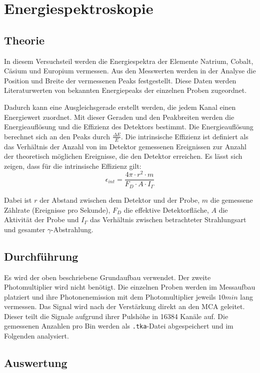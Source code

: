 \documentclass{../Misc/MontavonLaTeX/Montavon}
\begin{document}
\section{Energiespektroskopie}
\subsection{Theorie}
In diesem Versuchsteil werden die Energiespektra der Elemente Natrium, Cobalt, Cäsium und Europium vermessen. Aus den Messwerten werden in der Analyse die Position und Breite der vermessenen Peaks festgestellt.
Diese Daten werden Literaturwerten von bekannten Energiepeaks der einzelnen Proben zugeordnet. 

Dadurch kann eine Ausgleichsgerade erstellt werden, die jedem Kanal einen Energiewert zuordnet. Mit dieser Geraden und den Peakbreiten werden die Energieauflösung und die Effizienz des Detektors bestimmt. Die Energieauflösung berechnet sich an den Peaks durch $\frac{\Delta E}{E}$. Die intrinsische Effizienz ist definiert als das Verhältnis der Anzahl von im Detektor gemessenen Ereignissen zur Anzahl der theoretisch möglichen Ereignisse, die den Detektor erreichen. Es lässt sich zeigen, dass für die intrinsische Effizienz gilt:
\begin{equation}
\epsilon_{int} = \frac{4\pi \cdot r^{2} \cdot m}{F_{D} \cdot A \cdot I_{\Gamma}}
\label{eq:Effizienz}
\end{equation}

Dabei ist $r$ der Abstand zwischen dem Detektor und der Probe, $m$ die gemessene Zählrate (Ereignisse pro Sekunde), $F_D$ die effektive Detektorfläche, $A$ die Aktivität der Probe und $I_\Gamma$ das Verhältnis zwischen betrachteter Strahlungsart und gesamter $\gamma$-Abstrahlung.

\subsection{Durchführung}
Es wird der oben beschriebene Grundaufbau verwendet. Der zweite Photomultiplier wird nicht benötigt. Die einzelnen Proben werden im Messaufbau platziert und ihre Photonenemission mit dem Photomultiplier jeweils $10 \unit{min}$ lang  vermessen. Das Signal wird nach der  Verstärkung direkt an den MCA geleitet. Dieser teilt die Signale aufgrund ihrer Pulshöhe in 16384 Kanäle auf. Die gemessenen Anzahlen pro Bin werden als \texttt{.tka}-Datei abgespeichert und im Folgenden analysiert.

\subsection{Auswertung}
\end{document}
